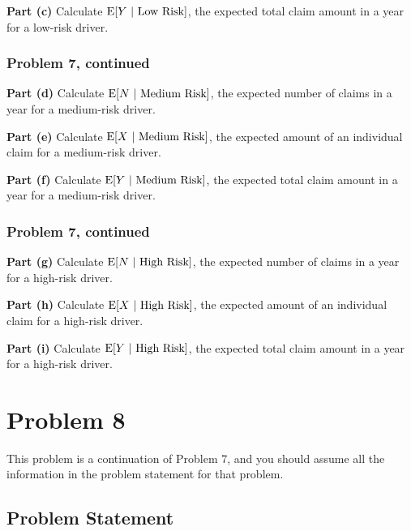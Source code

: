 \documentclass[12pt]{article}
\theoremstyle{definition}
\begin{document}
\vspace{3.5in}
\noindent
{\bf Part (c)} Calculate $\hbox{E}[Y\ |\ \hbox{Low Risk}]$, the expected total claim amount in a year for a low-risk driver.

\newpage
\subsubsection*{Problem 7, continued}

\bigskip
\noindent
{\bf Part (d)} Calculate $\hbox{E}[N\ |\ \hbox{Medium Risk}]$, the expected number of claims in a year for a medium-risk driver.

\vspace{1in}
\noindent
{\bf Part (e)} Calculate $\hbox{E}[X\ |\ \hbox{Medium Risk}]$, the expected amount of an individual claim for a medium-risk driver.

\vspace{3.5in}
\noindent
{\bf Part (f)} Calculate $\hbox{E}[Y\ |\ \hbox{Medium Risk}]$, the expected total claim amount in a year for a medium-risk driver.


\newpage
\subsubsection*{Problem 7, continued}

\bigskip
\noindent
{\bf Part (g)} Calculate $\hbox{E}[N\ |\ \hbox{High Risk}]$, the expected number of claims in a year for a high-risk driver.

\vspace{1in}
\noindent
{\bf Part (h)} Calculate $\hbox{E}[X\ |\ \hbox{High Risk}]$, the expected amount of an individual claim for a high-risk driver.

\vspace{3.5in}
\noindent
{\bf Part (i)} Calculate $\hbox{E}[Y\ |\ \hbox{High Risk}]$, the expected total claim amount in a year for a high-risk driver.


\newpage
\section*{Problem 8}

This problem is a continuation of Problem 7, and you should assume all the information in the problem statement for that problem.

\subsection*{Problem Statement}
\end{document}

